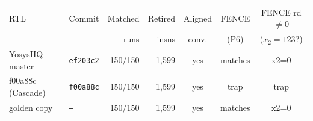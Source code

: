 \begin{tabular}{@{}l l r r c c c@{}}\toprule
RTL & Commit & Matched & Retired & Aligned & FENCE & FENCE rd$\neq$0\\
& & runs & insns & conv. & (P6) & ($x_2{=}123$?)\\\midrule
YosysHQ master & \texttt{ef203c2} & 150/150 & 1,599 & yes & matches & x2=0\\
f00a88c (Cascade) & \texttt{f00a88c} & 150/150 & 1,599 & yes & trap & trap\\
golden copy & \texttt{--} & 150/150 & 1,599 & yes & matches & x2=0\\
\bottomrule\end{tabular}